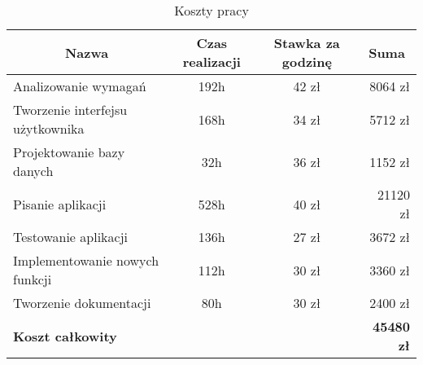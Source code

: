 \begin{table}[ht]
\begin{center}
\caption{Koszty pracy}
\begin{tabular}{| l | c | c | r |}
	\hline
	  \multicolumn{1}{|c|}{Nazwa} & \multicolumn{1}{|c|}{Czas realizacji} & \multicolumn{1}{|c|}{Stawka za godzinę} & \multicolumn{1}{|c|}{Suma} \\
	\hline
		Analizowanie wymagań & 192h & 42 zł & 8064 zł \\
	\hline
		Tworzenie interfejsu użytkownika & 168h  & 34 zł & 5712 zł \\
	\hline
		Projektowanie bazy danych & 32h & 36 zł & 1152 zł \\
	\hline
		Pisanie aplikacji & 528h  & 40 zł & 21120 zł \\
	\hline
		Testowanie aplikacji & 136h & 27 zł & 3672 zł \\
	\hline
		Implementowanie nowych funkcji & 112h & 30 zł & 3360 zł \\
	\hline
		Tworzenie dokumentacji & 80h & 30 zł & 2400 zł \\
	\hline
		\multicolumn{3}{|l}{\textbf{Koszt całkowity}} & \textbf{45480 zł} \\
	\hline
\end{tabular}
\end{center}
\end{table}
